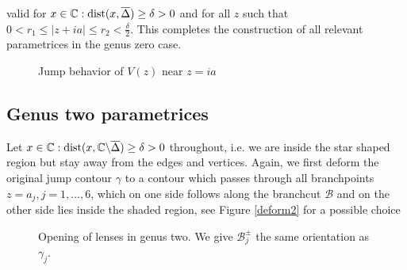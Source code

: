 \documentclass[10pt,oneside,reqno]{amsart}
\numberwithin{equation}{section}
\begin{document}
valid for $x\in\mathbb{C}:\textnormal{dist}(x,\overline{\Delta})\geq\delta>0$ and for all $z$ such that $0<r_1\leq|z+ia|\leq r_2<\frac{\delta}{2}$. This completes the 
construction of all relevant parametrices in the genus zero case.
\begin{figure}[tbh]
\begin{flushleft}
\hspace{3cm}\resizebox{0.4\textwidth}{!}{}
\caption{Jump behavior of $V(z)$ near $z=ia$}
\label{Vpara}
\end{flushleft}
\end{figure}
\subsection{Genus two parametrices}\label{secgen2} 
Let $x\in\mathbb{C}:\textnormal{dist}(x,\mathbb{C}\backslash\overline{\Delta})\geq\delta>0$ throughout, i.e. we are inside the star shaped
region but stay away from the edges and vertices. Again, we first deform the original jump contour $\gamma$ to a contour which passes through all branchpoints $z=a_j,j=1,\ldots,6$, which on one side follows along the branchcut $\mathcal{B}$ and on the other side lies inside the  shaded region, see Figure \ref{deform2} for a possible choice
\begin{figure}[tbh]
\begin{center}
\resizebox{0.3\textwidth}{!}{}\hspace{2cm} \resizebox{0.3\textwidth}{!}{}
\begin{minipage}{0.5\textwidth}
\caption{Deformation of the jump contour $\gamma$ to the union of $\mathcal{B}\cup\mathcal{L}$. 
The branchcuts $\mathcal{B}$ are indicated in red and $\mathcal{L}$ in black. The picture corresponds to one possible choice of $x\in\mathbb{C}:
\textnormal{dist}(x,\mathbb{C}\backslash\overline{\Delta})\geq\delta>0$ with $\Re x>0,\Im x>0$.}
\label{deform2}
\end{minipage}
\begin{minipage}{0.45\textwidth}

\caption{Opening of lenses in genus two. We give $\mathcal{B}_j^{\pm}$ the same orientation as $\gamma_j$.}
\label{open2}

\end{minipage}
\end{center}
\end{figure}
\end{document}
